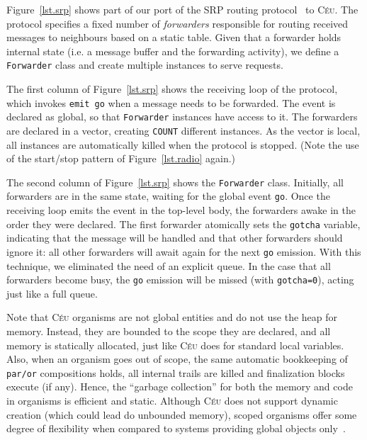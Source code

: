 \documentclass{sig-alternate-ipsn13}
\newcommand{\CEU}{\textsc{C\'{e}u}\xspace}
\newcommand{\code}[1] {{\small{\texttt{#1}}}}
\begin{document}
Figure~\ref{lst.srp} shows part of our port of the SRP routing 
protocol~\cite{wsn.teps} to \CEU.
The protocol specifies a fixed number of \emph{forwarders} responsible for 
routing received messages to neighbours based on a static table.
Given that a forwarder holds internal state (i.e. a message buffer and the 
forwarding activity), we define a \code{Forwarder} class and create multiple 
instances to serve requests.

The first column of Figure~\ref{lst.srp} shows the receiving loop of the 
protocol, which invokes \code{emit~go} when a message needs to be forwarded.
The event is declared as global, so that \code{Forwarder} instances have access 
to it.
The forwarders are declared in a vector, creating \code{COUNT} different 
instances.
As the vector is local, all instances are automatically killed when the 
protocol is stopped.
(Note the use of the start/stop pattern of Figure~\ref{lst.radio} again.)

The second column of Figure~\ref{lst.srp} shows the \code{Forwarder} class.
Initially, all forwarders are in the same state, waiting for the global event 
\code{go}.
Once the receiving loop emits the event in the top-level body, the forwarders 
awake in the order they were declared.
The first forwarder atomically sets the \code{gotcha} variable, indicating that 
the message will be handled and that other forwarders should ignore it:
all other forwarders will await again for the next \code{go} emission.
With this technique, we eliminated the need of an explicit queue.
In the case that all forwarders become busy, the \code{go} emission will be 
missed (with \code{gotcha=0}), acting just like a full queue.

Note that \CEU organisms are not global entities and do not use the heap for 
memory.
Instead, they are bounded to the scope they are declared, and all memory is 
statically allocated, just like \CEU does for standard local variables.
Also, when an organism goes out of scope, the same automatic bookkeeping of 
\code{par/or} compositions holds, all internal trails are killed and 
finalization blocks execute (if any).
Hence, the ``garbage collection'' for both the memory and code in organisms is 
efficient and static.
Although \CEU does not support dynamic creation (which could lead do unbounded 
memory), scoped organisms offer some degree of flexibility when compared to 
systems providing global objects only~\cite{wsn.virgil,wsn.flowtalk}.

\end{document}
